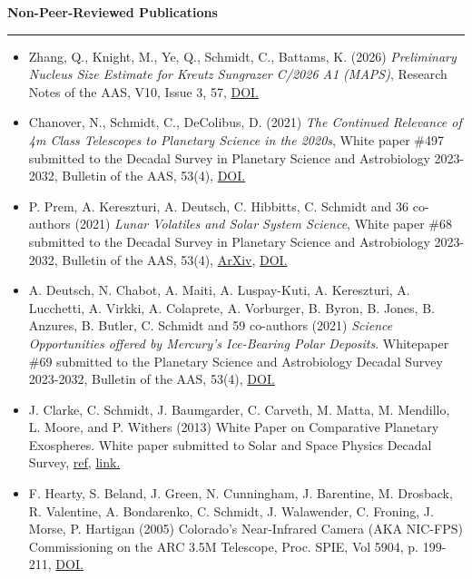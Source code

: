 \documentclass[12pt]{report}
\begin{document}
\vspace{2 mm}
\noindent\bf{Non-Peer-Reviewed Publications}\rm \hspace*{\fill} \\
\rule{\textwidth}{1pt}
 \begin{itemize} \itemsep -2pt %
  \item Zhang, Q., Knight, M., Ye, Q., Schmidt, C., Battams, K. (2026) \textit{Preliminary Nucleus Size Estimate for Kreutz Sungrazer C/2026 A1 (MAPS)}, Research Notes of the AAS, V10, Issue 3, 57, \href{https://doi.org/10.3847/2515-5172/ae5220}{DOI.}
  \item Chanover, N., Schmidt, C., DeColibus, D. (2021) \textit{ The Continued Relevance of 4m Class Telescopes to Planetary Science in the 2020s}, White paper \#497 submitted to the Decadal Survey in Planetary Science and Astrobiology 2023-2032, Bulletin of the AAS, 53(4), \href{https://doi.org/10.3847/25c2cfeb.752e4fa4}{DOI.}
  \item P. Prem, A. Kereszturi, A. Deutsch, C. Hibbitts, C. Schmidt and 36 co-authors (2021) \textit{Lunar Volatiles and Solar System Science}, White paper \#68 submitted to the Decadal Survey in Planetary Science and Astrobiology 2023-2032, Bulletin of the AAS, 53(4), \href{https://arxiv.org/ftp/arxiv/papers/2012/2012.06317.pdf}{ArXiv}, \href{https://doi.org/10.3847/25c2cfeb.f62324b8}{DOI.}
  \item A. Deutsch, N. Chabot, A. Maiti, A. Luspay-Kuti, A. Kereszturi, A. Lucchetti, A. Virkki, A. Colaprete, A. Vorburger, B. Byron, B. Jones, B. Anzures, B. Butler, C. Schmidt and 59 co-authors (2021) \textit{Science Opportunities offered by Mercury’s Ice-Bearing Polar Deposits}. Whitepaper \#69 submitted to the Planetary Science and Astrobiology Decadal Survey 2023-2032, Bulletin of the AAS, 53(4), \href{https://doi.org/10.3847/25c2cfeb.98885a8e8}{DOI.} 
  \item J. Clarke, C. Schmidt, J. Baumgarder, C. Carveth, M. Matta, M. Mendillo, L. Moore, and P. Withers (2013) White Paper on Comparative Planetary Exospheres. White paper submitted to Solar and Space Physics Decadal Survey, 
\href{https://sites.nationalacademies.org/SSB/CurrentProjects/SSB_056864}{ref,}
\href{http://sirius.bu.edu/withers/pppp/pdf/clarkeheiodswp2010.pdf}{link.}
  \item F. Hearty, S. Beland, J. Green, N. Cunningham, J. Barentine, M. Drosback, R. Valentine, A. Bondarenko, C. Schmidt, J. Walawender, C. Froning, J. Morse, P. Hartigan (2005) Colorado's Near-Infrared Camera (AKA NIC-FPS) Commissioning on the ARC 3.5M Telescope, Proc. SPIE, Vol 5904, p. 199-211, \href{https://doi.org/10.1117/12.617593}{DOI.}
  \end{itemize}
\end{document}
